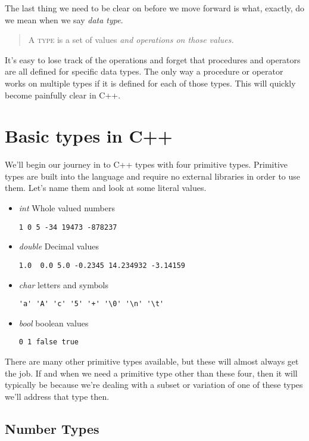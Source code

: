 \documentclass[]{tufte-handout}
\begin{document}
The last thing we need to be clear on before we move forward is what, exactly, do we mean when we say \textit{data type}.  
\begin{quote}
A \textsc{type} is a set of values \textit{and operations on those values.}  
\end{quote}
It's easy to lose track of the operations and forget that procedures and operators are all defined for specific data types.  The only way a procedure or operator works on multiple types if it is defined for each of those types. This will quickly become painfully clear in C++. 

\section{Basic types in C++}

We'll begin our journey in to C++ types with four primitive types.  Primitive types are built into the language and require no external libraries in order to use them. Let's name them and look at some literal values.
\begin{itemize}
\item \textit{int} Whole valued numbers
\begin{verbatim}
1 0 5 -34 19473 -878237
\end{verbatim}
\item \textit{double} Decimal values
\begin{verbatim}
1.0  0.0 5.0 -0.2345 14.234932 -3.14159
\end{verbatim}
\item \textit{char} letters and symbols
\begin{verbatim}
'a' 'A' 'c' '5' '+' '\0' '\n' '\t'
\end{verbatim}
\item \textit{bool} boolean values
\begin{verbatim}
0 1 false true
\end{verbatim}
\end{itemize}

There are many other primitive types available, but these will almost always get the job. If and when we need a primitive type other than these four, then it will typically be because we're dealing with a subset or variation of one of these types we'll address that type then. 

\subsection{Number Types}
\end{document}
